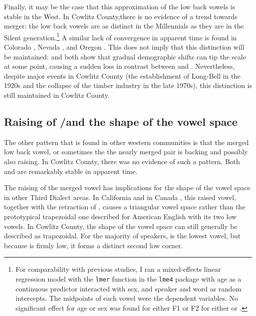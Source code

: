 Finally, it may be the case that this approximation of the low back vowels is stable in the West. In Cowlitz County,there is no evidence of a trend towards merger: the low back vowels are as distinct in the Millennials as they are in the Silent generation.\footnote{For comparability with previous studies, I ran a mixed-effects linear regression model with the \texttt{lmer} function in the \texttt{lme4} package \citep{bates_etal_2015_lme4} with age as a continuous predictor interacted with sex, and speaker and word as random intercepts. The midpoints of each vowel were the dependent variables. No significant effect for age or sex was found for either F1 or F2 for either \lot or \thought.} A similar lack of convergence in apparent time is found in Colorado \citep[18]{holland_brandenburg_2017_pads}, Nevada \citep[148]{fridland_kendall_2017_pads}, and Oregon \citep[115]{becker_etal_2016_pads}. This does not imply that this distinction will be maintained: \citet{herold_1990_diss} and \citet{johnson_2010_pads} both show that gradual demographic shifts can tip the scale at some point, causing a sudden loss in contrast between \lot and \thought. Nevertheless, despite major events in Cowlitz County (the establishment of Long-Bell in the 1920s and the collapse of the timber industry in the late 1970s), this distinction is still maintained in Cowlitz County.

\subsection{Raising of \lot/\thought and the shape of the vowel space}

The other pattern that is found in other western communities is that the merged low back vowel, or sometimes the the nearly merged pair \citep[19]{holland_brandenburg_2017_pads} is backing and possibly also raising. In Cowlitz County, there was no evidence of such a pattern. Both \lot and \thought are remarkably stable in apparent time.

The raising of the merged vowel has implications for the shape of the vowel space in other Third Dialect areas. In California \citep[23--24]{donofrio_etal_2017_pads} and in Canada \citep{boberg_2011}, this raised vowel, together with the retraction of \trap, causes a triangular vowel space rather than the prototypical trapezoidal one described for American English with its two low vowels. In Cowlitz County, the shape of the vowel space can still generally be described as trapezoidal. For the majority of speakers, \trap is the lowest vowel, but because \thought is firmly low, it forms a distinct second low corner.

